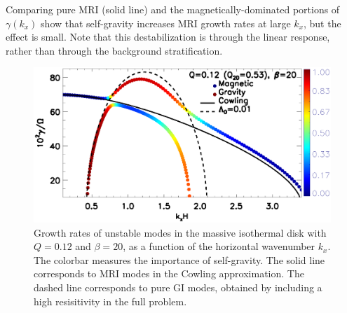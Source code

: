%

Comparing pure MRI (solid line) and the magnetically-dominated
portions of $\gamma(k_x)$ show that self-gravity increases MRI growth
rates at large $k_x$, but the effect is small. Note that this
destabilization is through the linear response, rather than through
the background stratification. 


\begin{figure}
  \includegraphics[width=\linewidth]{figures/compare_growth3_Q0d12_B20.ps}  
  \caption{Growth rates of unstable modes in the massive isothermal
    disk with $Q=0.12$ and $\beta=20$, as a function of the horizontal
    wavenumber $k_x$. The colorbar measures the importance of
    self-gravity. The solid line corresponds to MRI modes in the
    Cowling approximation. The dashed line corresponds to pure GI
    modes, obtained by including a high resisitivity in the full
    problem. 
    \label{compare_growth3_Q01d2}}
\end{figure}




